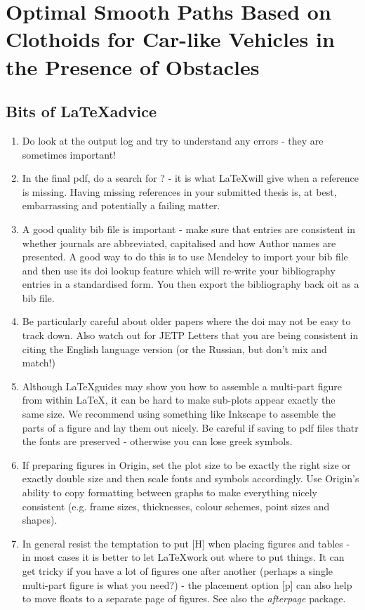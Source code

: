 \chapter{Optimal Smooth Paths Based on Clothoids for Car-like Vehicles in the Presence of Obstacles}


\section{Bits of \LaTeX advice}

\begin{enumerate}
	\item Do look at the output log and try to understand any errors - they are sometimes important!
	\item In the final pdf, do a search for ? - it is what \LaTeX will give when a reference is missing. Having missing references in your submitted thesis is, at best, embarrassing and potentially a failing matter.
	\item A good quality bib file is important - make sure that entries are consistent in whether journals are abbreviated, capitalised and how Author names are presented. A good way to do this is to use Mendeley to import your bib file and then use its doi lookup feature which will re-write your bibliography entries in a standardised form. You then export the bibliography back oit as a bib file.
	\item Be particularly careful about older papers where the doi may not be easy to track down. Also watch out for JETP Letters that you are being consistent in citing the English language version (or the Russian, but don't mix and match!)
	\item Although \LaTeX guides may show you how to assemble a multi-part figure from within \LaTeX, it can be hard to make sub-plots appear exactly the same size. We recommend using something like Inkscape to assemble the parts of a figure and lay them out nicely. Be careful if saving to pdf files thatr the fonts are preserved - otherwise you can lose greek symbols.
	\item If preparing figures in Origin, set the plot size to be exactly the right size or exactly double size and then scale fonts and symbols accordingly. Use Origin's ability to copy formatting between graphs to make everything nicely consistent (e.g. frame sizes, thicknesses, colour schemes, point sizes and shapes).
	\item In general resist the temptation to put [H] when placing figures and tables - in most cases it is better to let \LaTeX work out where to put things. It can get tricky if you have a lot of figures one after another (perhaps a single multi-part figure is what you need?) - the placement option [p] can also help to move floats to a separate page of figures. See also the \textit{afterpage} package. 
\end{enumerate}